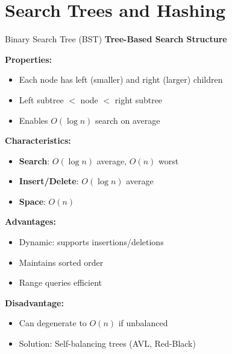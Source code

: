 \documentclass[aspectratio=169]{beamer}
\begin{document}
\section{Search Trees and Hashing}

\begin{frame}{Binary Search Tree (BST)}
  \textbf{Tree-Based Search Structure}

  \vspace{0.3cm}
  \textbf{Properties:}
  \begin{itemize}
    \item Each node has left (smaller) and right (larger) children
    \item Left subtree $<$ node $<$ right subtree
    \item Enables $O(\log n)$ search on average
  \end{itemize}

  \vspace{0.3cm}
  \textbf{Characteristics:}
  \begin{itemize}
    \item \textbf{Search}: $O(\log n)$ average, $O(n)$ worst
    \item \textbf{Insert/Delete}: $O(\log n)$ average
    \item \textbf{Space}: $O(n)$
  \end{itemize}

  \vspace{0.3cm}
  \textbf{Advantages:}
  \begin{itemize}
    \item Dynamic: supports insertions/deletions
    \item Maintains sorted order
    \item Range queries efficient
  \end{itemize}

  \vspace{0.3cm}
  \textbf{Disadvantage:}
  \begin{itemize}
    \item Can degenerate to $O(n)$ if unbalanced
    \item Solution: Self-balancing trees (AVL, Red-Black)
  \end{itemize}
\end{frame}
\end{document}
